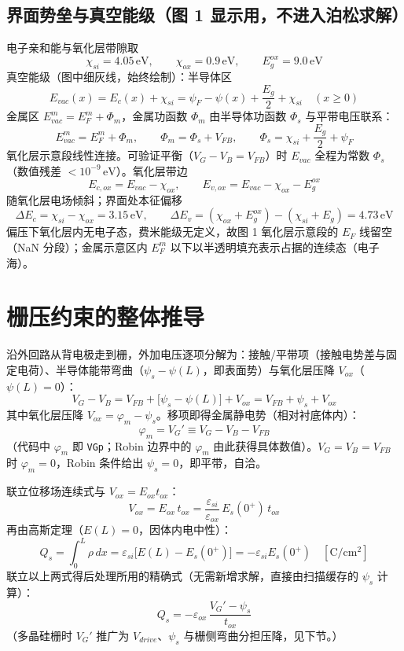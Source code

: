\documentclass[11pt]{ctexart}
\begin{document}
\subsection{界面势垒与真空能级（图 1 显示用，不进入泊松求解）}
电子亲和能与氧化层带隙取
\[\chi_{si}=4.05\,\mathrm{eV},\qquad \chi_{ox}=0.9\,\mathrm{eV},\qquad E_g^{ox}=9.0\,\mathrm{eV}\]
真空能级（图中细灰线，始终绘制）：半导体区
\[E_{vac}(x)=E_c(x)+\chi_{si}=\psi_F-\psi(x)+\frac{E_g}{2}+\chi_{si}\quad(x\ge0)\]
金属区 $E_{vac}^m=E_F^m+\Phi_m$，金属功函数 $\Phi_m$ 由半导体功函数 $\Phi_s$ 与平带电压联系：
\[E_{vac}^{m}=E_F^m+\Phi_m,\qquad \Phi_m=\Phi_s+V_{FB},\qquad \Phi_s=\chi_{si}+\frac{E_g}{2}+\psi_F\]
氧化层示意段线性连接。可验证平衡（$V_G-V_B=V_{FB}$）时 $E_{vac}$ 全程为常数 $\Phi_s$（数值残差 $<10^{-9}\,\mathrm{eV}$）。氧化层带边
\[E_{c,ox}=E_{vac}-\chi_{ox},\qquad E_{v,ox}=E_{vac}-\chi_{ox}-E_g^{ox}\]
随氧化层电场倾斜；界面处本征偏移
\[\Delta E_c=\chi_{si}-\chi_{ox}=3.15\,\mathrm{eV},\qquad \Delta E_v=(\chi_{ox}+E_g^{ox})-(\chi_{si}+E_g)=4.73\,\mathrm{eV}\]
偏压下氧化层内无电子态，费米能级无定义，故图 1 氧化层示意段的 $E_F$ 线留空（NaN 分段）；金属示意区内 $E_F^m$ 以下以半透明填充表示占据的连续态（电子海）。

\section{栅压约束的整体推导}

沿外回路从背电极走到栅，外加电压逐项分解为：接触/平带项（接触电势差与固定电荷）、半导体能带弯曲（$\psi_s-\psi(L)$，即表面势）与氧化层压降 $V_{ox}$（$\psi(L)=0$）：
\[V_G-V_B=V_{FB}+\big[\psi_s-\psi(L)\big]+V_{ox}=V_{FB}+\psi_s+V_{ox}\]
其中氧化层压降
\(V_{ox}=\varphi_m-\psi_s\)。移项即得金属静电势（相对衬底体内）：
\[\varphi_m=V_G'\equiv V_G-V_B-V_{FB}\]
（代码中 $\varphi_m$ 即 \texttt{VGp}；Robin 边界中的 $\varphi_m$ 由此获得具体数值）。$V_G=V_B=V_{FB}$ 时 $\varphi_m=0$，Robin 条件给出 $\psi_s=0$，即平带，自洽。

联立位移场连续式与 $V_{ox}=E_{ox}t_{ox}$：
\[V_{ox}=E_{ox}\,t_{ox}=\frac{\varepsilon_{si}}{\varepsilon_{ox}}\,E_s(0^+)\,t_{ox}\]
再由高斯定理（$E(L)=0$，因体内电中性）：
\[Q_s=\int_0^L\rho\,dx=\varepsilon_{si}\big[E(L)-E_s(0^+)\big]=-\varepsilon_{si}E_s(0^+)\quad [\mathrm{C/cm^2}]\]
联立以上两式得后处理所用的精确式（无需新增求解，直接由扫描缓存的 $\psi_s$ 计算）：
\[Q_s=-\varepsilon_{ox}\,\frac{V_G'-\psi_s}{t_{ox}}\]
（多晶硅栅时 $V_G'$ 推广为 $V_{drive}$、$\psi_s$ 与栅侧弯曲分担压降，见下节。）
\end{document}
